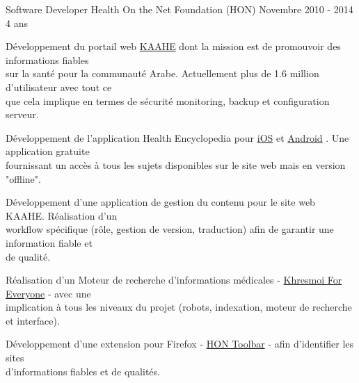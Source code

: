 
\begin{cventries}

  \cventry
    {Software Developer}
    {Health On the Net Foundation (HON)}
    {Novembre 2010 - 2014}
    {4 ans}
    {
      \begin{cvitems}
        \item{Développement du portail web
          {\color{awesome-skyblue}\href{http://www.kaahe.org/}{KAAHE}}
          dont la mission est de promouvoir des informations fiables \\
          sur la santé pour la communauté Arabe. Actuellement plus de 1.6
          million d'utilisateur avec tout ce \\que cela implique en termes de
          sécurité monitoring, backup et configuration serveur.
        }
        \item{Développement de l'application Health Encyclopedia pour
          {\color{awesome-skyblue}
            \href{https://itunes.apple.com/us/app/almwsw-t-alshyt/id624559765?l=fr&ls=1&mt=8}{iOS}}
          et
          {\color{awesome-skyblue}
            \href{https://play.google.com/store/apps/details?id=org.kaahe.kaaheApp&hl=en}{Android}}
          . Une application gratuite \\fournissant un accès à tous les sujets
          disponibles sur le site web mais en version "offline".
        }
        \item{Développement d'une application de gestion du contenu pour le
          site web KAAHE. Réalisation d'un \\workflow spécifique (rôle, gestion
          de version, traduction) afin de garantir une information fiable et \\
          de qualité.
        }
        \item{Réalisation d'un Moteur de recherche d'informations médicales -
          {\color{awesome-skyblue}
            \href{http://everyone.khresmoi.eu/}{Khresmoi For Everyone}}
            - avec une \\implication à tous les niveaux du projet (robots,
            indexation, moteur de recherche et interface).
        }
        \item{Développement d'une extension pour Firefox -
          {\color{awesome-skyblue}
          \href{https://addons.mozilla.org/en-US/firefox/addon/hon-toolbar/}{HON Toolbar}} -
          afin d'identifier les sites \\d'informations fiables et de qualités.
        }
      \end{cvitems}
    }


\end{cventries}
